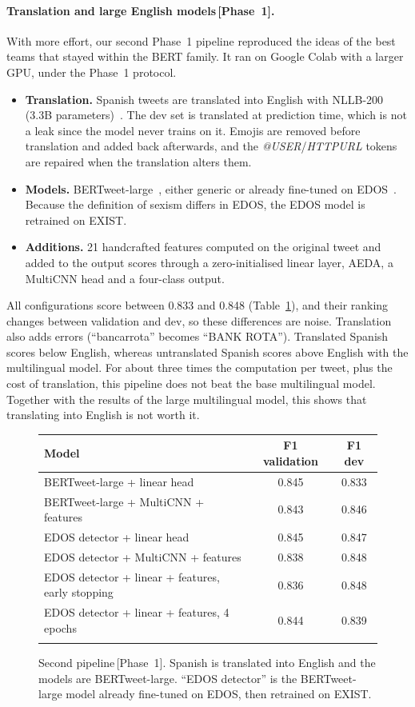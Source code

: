 \documentclass[pdflatex,sn-mathphys-num]{sn-jnl}
\makeatletter
\newenvironment{Htable}{\begin{figure}[H]\def\@captype{table}\begin{center}\begin{threeparttable}\tablebodyfont}{\end{threeparttable}\end{center}\end{figure}}
\newcommand{\Pone}{\,{\normalfont\textsf{\small[Phase~1]}}}
\makeatother
\begin{document}
\paragraph{Translation and large English models\Pone.} With more effort, our second Phase~1 pipeline reproduced the ideas of the best teams that stayed within the BERT family. It ran on Google Colab with a larger GPU, under the Phase~1 protocol.
\begin{itemize}
\item \textbf{Translation.} Spanish tweets are translated into English with NLLB-200 (3.3B parameters)~\cite{nllb2022}. The dev set is translated at prediction time, which is not a leak since the model never trains on it. Emojis are removed before translation and added back afterwards, and the \emph{@USER}/\emph{HTTPURL} tokens are repaired when the translation alters them.
\item \textbf{Models.} BERTweet-large~\cite{nguyen2020bertweet}, either generic or already fine-tuned on EDOS~\cite{nlpltu_model}. Because the definition of sexism differs in EDOS, the EDOS model is retrained on EXIST.
\item \textbf{Additions.} 21 handcrafted features computed on the original tweet and added to the output scores through a zero-initialised linear layer, AEDA, a MultiCNN head and a four-class output.
\end{itemize}
All configurations score between 0.833 and 0.848 (Table~\ref{tab:second}), and their ranking changes between validation and dev, so these differences are noise. Translation also adds errors (``bancarrota'' becomes ``BANK ROTA''). Translated Spanish scores below English, whereas untranslated Spanish scores above English with the multilingual model. For about three times the computation per tweet, plus the cost of translation, this pipeline does not beat the base multilingual model. Together with the results of the large multilingual model, this shows that translating into English is not worth it.

\begin{Htable}
\caption{Second pipeline\Pone. Spanish is translated into English and the models are BERTweet-large. ``EDOS detector'' is the BERTweet-large model already fine-tuned on EDOS, then retrained on EXIST.}\label{tab:second}
\begin{tabular}{@{}lcc@{}}
\toprule
Model & F1 validation & F1 dev \\
\midrule
BERTweet-large + linear head & 0.845 & 0.833 \\
BERTweet-large + MultiCNN + features & 0.843 & 0.846 \\
EDOS detector + linear head & 0.845 & 0.847 \\
EDOS detector + MultiCNN + features & 0.838 & 0.848 \\
EDOS detector + linear + features, early stopping & 0.836 & 0.848 \\
EDOS detector + linear + features, 4 epochs & 0.844 & 0.839 \\
\botrule
\end{tabular}
\end{Htable}
\end{document}
